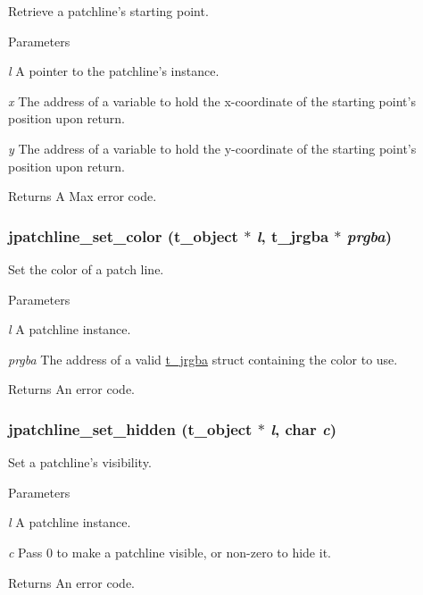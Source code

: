 Retrieve a patchline's starting point. 
\begin{DoxyParams}{Parameters}
\item[{\em l}]A pointer to the patchline's instance. \item[{\em x}]The address of a variable to hold the x-\/coordinate of the starting point's position upon return. \item[{\em y}]The address of a variable to hold the y-\/coordinate of the starting point's position upon return. \end{DoxyParams}
\begin{DoxyReturn}{Returns}
A Max error code. 
\end{DoxyReturn}
\hypertarget{group__jpatchline_ga711fb3e7a43bbfbd6922f3ac60ba7d86}{
\subsubsection[{jpatchline\_\-set\_\-color}]{ jpatchline\_\-set\_\-color ({\bf t\_\-object} $\ast$ {\em l}, \/  {\bf t\_\-jrgba} $\ast$ {\em prgba})}}
\label{group__jpatchline_ga711fb3e7a43bbfbd6922f3ac60ba7d86}


Set the color of a patch line. 
\begin{DoxyParams}{Parameters}
\item[{\em l}]A patchline instance. \item[{\em prgba}]The address of a valid \hyperlink{structt__jrgba}{t\_\-jrgba} struct containing the color to use. \end{DoxyParams}
\begin{DoxyReturn}{Returns}
An error code. 
\end{DoxyReturn}
\hypertarget{group__jpatchline_gae5bd6fbfa02559350ee2b117a55b64d5}{
\subsubsection[{jpatchline\_\-set\_\-hidden}]{ jpatchline\_\-set\_\-hidden ({\bf t\_\-object} $\ast$ {\em l}, \/  char {\em c})}}
\label{group__jpatchline_gae5bd6fbfa02559350ee2b117a55b64d5}


Set a patchline's visibility. 
\begin{DoxyParams}{Parameters}
\item[{\em l}]A patchline instance. \item[{\em c}]Pass 0 to make a patchline visible, or non-\/zero to hide it. \end{DoxyParams}
\begin{DoxyReturn}{Returns}
An error code. 
\end{DoxyReturn}
